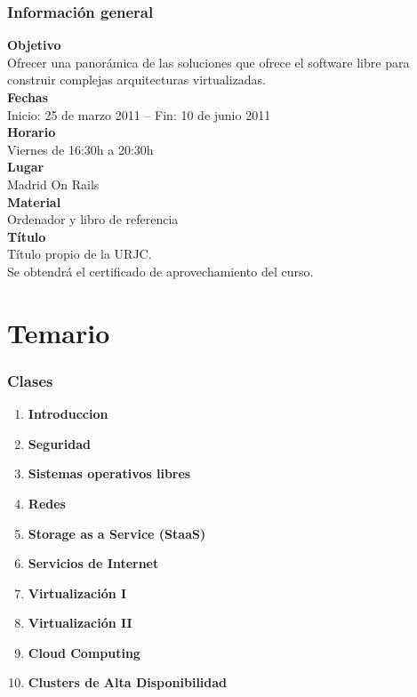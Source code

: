 \documentclass{beamer}
\begin{document}
\begin{frame}
\frametitle{Información general}
\textbf{Objetivo}\\
\hspace{0.3cm}Ofrecer una panorámica de las soluciones que ofrece el software libre para construir complejas arquitecturas virtualizadas.\\
\textbf{Fechas}\\
\hspace{0.3cm}Inicio: 25 de marzo 2011 -- Fin: 10 de junio 2011\\
\textbf{Horario}\\
\hspace{0.3cm}Viernes de 16:30h a 20:30h\\
\textbf{Lugar}\\
\hspace{0.3cm}Madrid On Rails\\
\textbf{Material}\\
\hspace{0.3cm}Ordenador y libro de referencia\\
\textbf{Título}\\
\hspace{0.3cm}Título propio de la URJC.\\
\hspace{0.3cm}Se obtendrá el certificado de aprovechamiento del curso.
\end{frame}

\section{Temario}
\begin{frame}
\frametitle{Clases}
\begin{enumerate}
\item \textbf{Introduccion}
\item \textbf{Seguridad}
\item \textbf{Sistemas operativos libres}
\item \textbf{Redes}
\item \textbf{Storage as a Service (StaaS)}
\item \textbf{Servicios de Internet}
\item \textbf{Virtualización I}
\item \textbf{Virtualización II}
\item \textbf{Cloud Computing}
\item \textbf{Clusters de Alta Disponibilidad}
\end{enumerate}
\end{frame}
\end{document}
